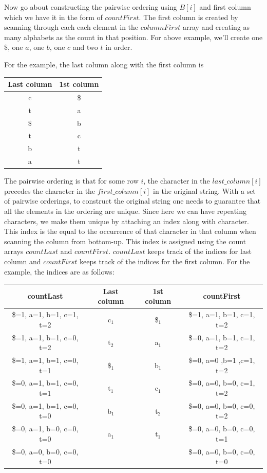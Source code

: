 \documentclass{article}
\begin{document}
Now go about constructing the pairwise ordering using $B[i]$ and first column which we have it in the form of $countFirst$. The first column is created by scanning through each each element in the $columnFirst$ array and creating as many alphabets as the count in that position. For above example, we'll create one \$, one $a$, one $b$, one $c$ and two $t$ in order.

For the example, the last column along with the first column is \\

\begin{tabular}{c|c}  
Last column & 1st column \\ \hline
c & \$ \\
t & a \\
\$ & b \\
t & c \\
b & t \\
a & t \\
\end{tabular}

The pairwise ordering is that for some row $i$, the character in the $last\_column[i]$ precedes the character in the $first\_column[i]$ in the original string. With a set of pairwise orderings, to construct the original string one needs to guarantee that all the elements in the ordering are unique. Since here we can have repeating characters, we make them unique by attaching an index along with character. This index is the equal to the occurrence of that character in that column when scanning the column from bottom-up. This index is assigned using the count arrays $countLast$ and $countFirst$. $countLast$ keeps track of the indices for last column and $countFirst$ keeps track of the indices for the first column. For the example, the indices are as follows:

\begin{tabular}{c|c|c|c}  
countLast             & Last column       & 1st column     & countFirst			 \\ \hline
\$=1, a=1, b=1, c=1, t=2 & c$_{1}$           & \$$_{1}$       &  \$=1, a=1, b=1, c=1, t=2\\
\$=1, a=1, b=1, c=0, t=2 & t$_{2}$           & a$_{1}$        &  \$=0, a=1, b=1, c=1, t=2\\
\$=1, a=1, b=1, c=0, t=1 & \$$_{1}$           & b$_{1}$        &  \$=0, a=0 ,b=1 ,c=1, t=2\\
\$=0, a=1, b=1, c=0, t=1 & t$_{1}$           & c$_{1}$        &  \$=0, a=0, b=0, c=1, t=2\\
\$=0, a=1, b=1, c=0, t=0 & b$_{1}$           & t$_{2}$        &  \$=0, a=0, b=0, c=0, t=2\\
\$=0, a=1, b=0, c=0, t=0 & a$_{1}$           & t$_{1}$        &  \$=0, a=0, b=0, c=0, t=1\\
\$=0, a=0, b=0, c=0, t=0 &                   &                &  \$=0, a=0, b=0, c=0, t=0\\
\end{tabular}
\end{document}
